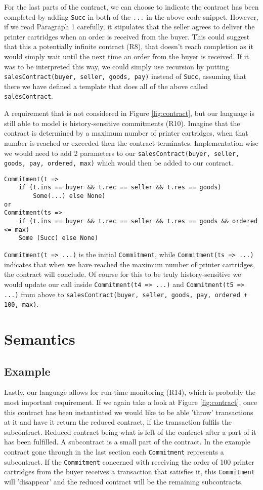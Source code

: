 \documentclass{ituthesis}
\begin{document}
For the last parts of the contract, we can choose to indicate the contract has been completed by adding \texttt{Succ} in both of the \texttt{...} in the above code snippet. However, if we read Paragraph 1 carefully, it stipulates that the seller agrees to deliver the printer cartridges when an order is received from the buyer. This could suggest that this a potentially infinite contract (R8), that doesn't reach completion as it would simply wait until the next time an order from the buyer is received. If it was to be interpreted this way, we could simply use recursion by putting \texttt{salesContract(buyer, seller, goods, pay)} instead of \texttt{Succ}, assuming that there we have defined a template that does all of the above called \texttt{salesContract}.

A requirement that is not considered in Figure \ref{fig:contract}, but our language is still able to model is history-sensitive commitments (R10). Imagine that the contract is determined by a maximum number of printer cartridges, when that number is reached or exceeded then the contract terminates. Implementation-wise we would need to add 2 parameters to our \texttt{salesContract(buyer, seller, goods, pay, ordered, max)} which would then be added to our contract.
\begin{lstlisting}
Commitment(t => 
    if (t.ins == buyer && t.rec == seller && t.res == goods) 
        Some(...) else None)
or
Commitment(ts => 
    if (t.ins == buyer && t.rec == seller && t.res == goods && ordered <= max)
    Some (Succ) else None)
\end{lstlisting}
\texttt{Commitment(t => ...)} is the initial \texttt{Commitment}, while \texttt{Commitment(ts => ...)} indicates that when we have reached the maximum number of printer cartridges, the contract will conclude. Of course for this to be truly history-sensitive we would update our call inside \texttt{Commitment(t4 => ...)} and \texttt{Commitment(t5 => ...)} from above to \texttt{salesContract(buyer, seller, goods, pay, ordered + 100, max)}.

\section{Semantics}
\subsection{Example}
Lastly, our language allows for run-time monitoring (R14), which is probably the most important requirement. If we again take a look at Figure \ref{fig:contract}, once this contract has been instantiated we would like to be able 'throw' transactions at it and have it return the reduced contract, if the transaction fulfils the subcontract. Reduced contract being what is left of the contract after a part of it has been fulfilled. A subcontract is a small part of the contract. In the example contract gone through in the last section each \texttt{Commitment} represents a subcontract. If the \texttt{Commitment} concerned with receiving the order of 100 printer cartridges from the buyer receives a transaction that satisfies it, this \texttt{Commitment} will 'disappear' and the reduced contract will be the remaining subcontracts. 
\end{document}
